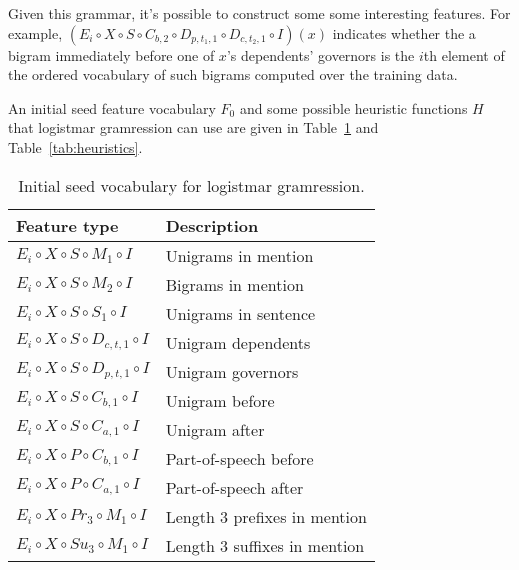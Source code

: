 \documentclass[11pt,letterpaper]{article}
\begin{document}
Given this grammar, it's possible to construct some 
some interesting features.  For example, 
$(E_i\circ X\circ S\circ C_{b,2}\circ D_{p,t_1,1}\circ D_{c,t_2,1}\circ I)(x)$ indicates whether the a bigram immediately before one of $x$'s dependents' governors is the $i$th element of the ordered vocabulary of such bigrams
computed over the training data.

An initial seed feature vocabulary $F_0$ and some possible
heuristic functions $H$ that logistmar gramression can
use are given in Table~\ref{tab:seed-vocab} and 
Table~\ref{tab:heuristics}.

\begin{table}[H]
\begin{tabular}{ |l|l| }
  \hline
  \textbf{Feature type}           & \textbf{Description} \\
  \hline 
   $E_i\circ X\circ S\circ M_1\circ I$ & Unigrams in mention \\
   $E_i\circ X\circ S\circ M_2\circ I$ & Bigrams in mention \\
   $E_i\circ X\circ S\circ S_1\circ I$ & Unigrams in sentence \\
   $E_i\circ X\circ S\circ D_{c,t,1}\circ I$ & Unigram dependents \\
   $E_i\circ X\circ S\circ D_{p,t,1}\circ I$ & Unigram governors \\
   $E_i\circ X\circ S\circ C_{b,1}\circ I$ & Unigram before \\
   $E_i\circ X\circ S\circ C_{a,1}\circ I$ & Unigram after \\
   $E_i\circ X\circ P\circ C_{b,1}\circ I$ & Part-of-speech before \\ 
   $E_i\circ X\circ P\circ C_{a,1}\circ I$ & Part-of-speech after \\
   $E_i\circ X\circ Pr_3\circ M_1\circ I$ & Length 3 prefixes in mention \\
   $E_i\circ X\circ Su_3\circ M_1\circ I$ & Length 3 suffixes in mention \\
  \hline
\end{tabular}
\caption{\label{tab:seed-vocab} Initial seed vocabulary
for logistmar gramression.} 
\end{table}
\end{document}
